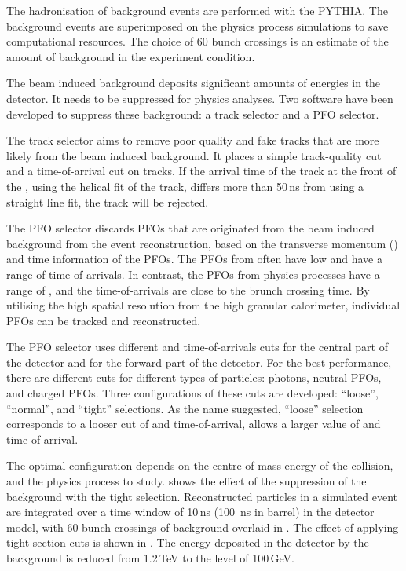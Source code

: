 The hadronisation of  \ggHad background events are performed with the PYTHIA. The  \ggHad background events are superimposed on the physics process simulations to save computational resources. The choice of 60 bunch crossings is an estimate  of  the amount of background in the experiment condition\cite{Barklow:1443518}.

The beam induced background deposits significant amounts of energies in the detector. It needs to be suppressed for physics analyses. Two software have been developed to suppress these background: a track selector and a PFO selector\cite{Marshall:2012ry}.

The track selector aims to remove poor quality and fake tracks that are more likely from the beam induced background. It places a simple track-quality cut and a time-of-arrival cut on tracks. If the arrival time of the track at the front of the \ECAL, using the helical fit of the track, differs more than 50\,ns from using a straight line fit, the track will be rejected.


The PFO selector discards PFOs that are originated from the beam induced background from the event reconstruction, based on the transverse momentum (\pT) and time information of the PFOs. The PFOs from \ggHad often have low \pT and have a range of time-of-arrivals. In contrast, the PFOs from physics processes have a range of \pT, and the time-of-arrivals are close to the brunch crossing time. By utilising the high spatial resolution from the high granular calorimeter, individual PFOs can be tracked and reconstructed.

The PFO selector uses different \pT and time-of-arrivals cuts for the central part of the detector and for the forward part of the detector. For the best performance, there are different cuts for different types of particles: photons, neutral PFOs, and charged PFOs. Three configurations of these cuts are developed: ``loose'', ``normal'', and ``tight'' selections. As the name suggested, ``loose'' selection corresponds to a looser cut of \pT and time-of-arrival, allows a larger value of \pT and time-of-arrival.

The optimal configuration depends on the centre-of-mass energy of the collision, and the physics process to study.  shows the effect of the suppression of the background with the tight \PFO selection. Reconstructed particles  in a simulated \HepProcess{\Pep\Pem \to \PHiggs\PHiggs \to \Ptop\APbottom\Pbottom\APtop} event  are integrated over a time window of 10\,ns (100 \,ns in \HCAL barrel) in the \CLICILD detector model, with 60 bunch crossings of \ggHad background overlaid in . The effect of applying tight \PFO section cuts is shown in . The energy deposited in the detector by the background is reduced from 1.2\,TeV to the level of 100\,GeV.


